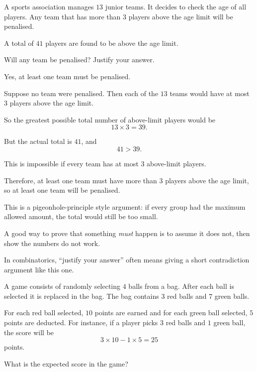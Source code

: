 \begin{problem}
A sports association manages $13$ junior teams. It decides to check the age of all players. Any team that has more than $3$ players above the age limit will be penalised.

A total of $41$ players are found to be above the age limit.

Will any team be penalised? Justify your answer.
\end{problem}

\begin{solution}
Yes, at least one team must be penalised.

Suppose no team were penalised. Then each of the $13$ teams would have at most $3$ players above the age limit.

So the greatest possible total number of above-limit players would be
\[
13 \times 3 = 39.
\]

But the actual total is $41$, and
\[
41 > 39.
\]

This is impossible if every team has at most $3$ above-limit players.

Therefore, at least one team must have more than $3$ players above the age limit, so at least one team will be penalised.
\end{solution}

\begin{takeaways}
\item This is a pigeonhole-principle style argument: if every group had the maximum allowed amount, the total would still be too small.
\item A good way to prove that something \emph{must} happen is to assume it does not, then show the numbers do not work.
\item In combinatorics, ``justify your answer'' often means giving a short contradiction argument like this one.
\end{takeaways}

\begin{problem}
A game consists of randomly selecting $4$ balls from a bag. After each ball is selected it is replaced in the bag. The bag contains $3$ red balls and $7$ green balls.

For each red ball selected, $10$ points are earned and for each green ball selected, $5$ points are deducted. For instance, if a player picks $3$ red balls and $1$ green ball, the score will be
\[
3\times 10 - 1\times 5 = 25
\]
points.

What is the expected score in the game?
\end{problem}

